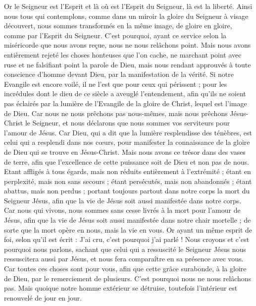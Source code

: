 \begin{multicols}{2}
Or le Seigneur est l'Esprit et là où est l'Esprit du Seigneur, là est la liberté.
Ainsi nous tous qui contemplons, comme dans un miroir la gloire du Seigneur à visage découvert, nous sommes transformés en la même image, de gloire en gloire, comme par l'Esprit du Seigneur.
\VerseOne{}C'est pourquoi, ayant ce service selon la miséricorde que nous avons reçue, nous ne nous relâchons point.
Mais nous avons entièrement rejeté les choses honteuses que l'on cache, ne marchant point avec ruse et ne falsifiant point la parole de Dieu, mais nous rendant approuvés à toute conscience d'homme devant Dieu, par la manifestation de la vérité.
Si notre Evangile est encore voilé, il ne l'est que pour ceux qui périssent ;
pour les incrédules dont le dieu de ce siècle a aveuglé l'entendement, afin qu'ils ne soient pas éclairés par la lumière de l'Evangile de la gloire de Christ, lequel est l'image de Dieu.
Car nous ne nous prêchons pas nous-mêmes, mais nous prêchons Jésus-Christ le Seigneur, et nous déclarons que nous sommes vos serviteurs pour l'amour de Jésus.
Car Dieu, qui a dit que la lumière resplendisse des ténèbres, est celui qui a resplendi dans nos cœurs, pour manifester la connaissance de la gloire de Dieu qui se trouve en Jésus-Christ.
Mais nous avons ce trésor dans des vases de terre, afin que l'excellence de cette puissance soit de Dieu et non pas de nous.
Etant affligés à tous égards, mais non réduits entièrement à l'extrémité ; étant en perplexité, mais non sans secours ;
étant persécutés, mais non abandonnés ; étant abattus, mais non perdus ;
portant toujours partout dans notre corps la mort du Seigneur Jésus, afin que la vie de Jésus soit aussi manifestée dans notre corps.
Car nous qui vivons, nous sommes sans cesse livrés à la mort pour l'amour de Jésus, afin que la vie de Jésus soit aussi manifestée dans notre chair mortelle ;
de sorte que la mort opère en nous, mais la vie en vous.
Or ayant un même esprit de foi, selon qu'il est écrit : J'ai cru, c'est pourquoi j'ai parlé ! Nous croyons et c'est pourquoi nous parlons,
sachant que celui qui a ressuscité le Seigneur Jésus nous ressuscitera aussi par Jésus, et nous fera comparaître en sa présence avec vous.
Car toutes ces choses sont pour vous, afin que cette grâce surabonde, à la gloire de Dieu, par le remerciement de plusieurs.
C'est pourquoi nous ne nous relâchons pas. Mais quoique notre homme extérieur se détruise, toutefois l'intérieur est renouvelé de jour en jour.

\end{multicols}
